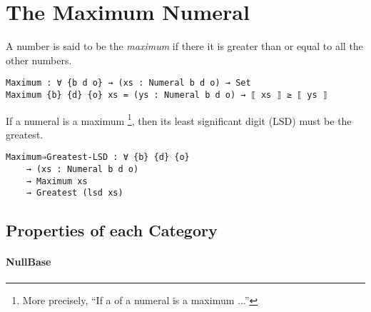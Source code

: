 \documentclass[\main/thesis.tex]{subfiles}
\begin{document}
\section{The Maximum Numeral}\label{maximum}

A number is said to be the \textit{maximum} if there it is greater than or equal
to all the other numbers.

\begin{lstlisting}
Maximum : ∀ {b d o} → (xs : Numeral b d o) → Set
Maximum {b} {d} {o} xs = (ys : Numeral b d o) → ⟦ xs ⟧ ≥ ⟦ ys ⟧
\end{lstlisting}

If a numeral is a maximum
\footnote{More precisely, ``If a  of a numeral is a maximum ...''},
then its least significant digit (LSD) must be the greatest.

\begin{lstlisting}
Maximum⇒Greatest-LSD : ∀ {b} {d} {o}
    → (xs : Numeral b d o)
    → Maximum xs
    → Greatest (lsd xs)
\end{lstlisting}



\subsection{Properties of each Category}

\paragraph{NullBase}

\begin{center}
    \begin{adjustbox}{max width=\textwidth}
    \end{adjustbox}
\end{center}
\end{document}
